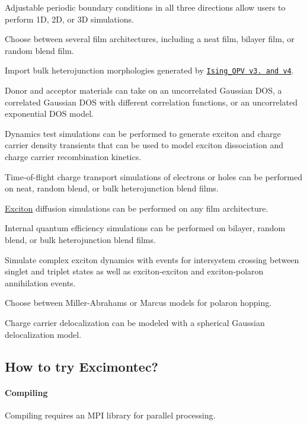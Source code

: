 \begin{DoxyItemize}
\item Adjustable periodic boundary conditions in all three directions allow users to perform 1D, 2D, or 3D simulations.
\item Choose between several film architectures, including a neat film, bilayer film, or random blend film.
\item Import bulk heterojunction morphologies generated by \href{https://github.com/MikeHeiber/Ising_OPV}{\tt Ising\+\_\+\+O\+PV v3. and v4}.
\item Donor and acceptor materials can take on an uncorrelated Gaussian D\+OS, a correlated Gaussian D\+OS with different correlation functions, or an uncorrelated exponential D\+OS model.
\item Dynamics test simulations can be performed to generate exciton and charge carrier density transients that can be used to model exciton dissociation and charge carrier recombination kinetics.
\item Time-\/of-\/flight charge transport simulations of electrons or holes can be performed on neat, random blend, or bulk heterojunction blend films.
\item \hyperlink{class_exciton}{Exciton} diffusion simulations can be performed on any film architecture.
\item Internal quantum efficiency simulations can be performed on bilayer, random blend, or bulk heterojunction blend films.
\item Simulate complex exciton dynamics with events for intersystem crossing between singlet and triplet states as well as exciton-\/exciton and exciton-\/polaron annihilation events.
\item Choose between Miller-\/\+Abrahams or Marcus models for polaron hopping.
\item Charge carrier delocalization can be modeled with a spherical Gaussian delocalization model.
\end{DoxyItemize}

\subsection*{How to try Excimontec?}

\paragraph*{Compiling}

Compiling requires an M\+PI library for parallel processing.

